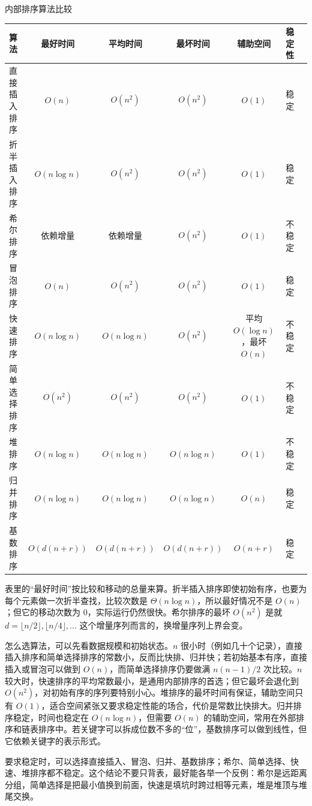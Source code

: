 \begin{tablebox}{内部排序算法比较}
\centering
\small
\begin{tabular}{lcccccc}
\toprule
算法 & 最好时间 & 平均时间 & 最坏时间 & 辅助空间 & 稳定性 \\
\midrule
直接插入排序 & $O(n)$ & $O(n^2)$ & $O(n^2)$ & $O(1)$ & 稳定 \\
折半插入排序 & $O(n\log n)$ & $O(n^2)$ & $O(n^2)$ & $O(1)$ & 稳定 \\
希尔排序 & 依赖增量 & 依赖增量 & $O(n^2)$ & $O(1)$ & 不稳定 \\
冒泡排序 & $O(n)$ & $O(n^2)$ & $O(n^2)$ & $O(1)$ & 稳定 \\
快速排序 & $O(n\log n)$ & $O(n\log n)$ & $O(n^2)$ & 平均 $O(\log n)$，最坏 $O(n)$ & 不稳定 \\
简单选择排序 & $O(n^2)$ & $O(n^2)$ & $O(n^2)$ & $O(1)$ & 不稳定 \\
堆排序 & $O(n\log n)$ & $O(n\log n)$ & $O(n\log n)$ & $O(1)$ & 不稳定 \\
归并排序 & $O(n\log n)$ & $O(n\log n)$ & $O(n\log n)$ & $O(n)$ & 稳定 \\
基数排序 & $O(d(n+r))$ & $O(d(n+r))$ & $O(d(n+r))$ & $O(n+r)$ & 稳定 \\
\bottomrule
\end{tabular}
\end{tablebox}

表里的“最好时间”按比较和移动的总量来算。折半插入排序即使初始有序，也要为每个元素做一次折半查找，比较次数是 $\Theta(n\log n)$，所以最好情况不是 $O(n)$；但它的移动次数为 0，实际运行仍然很快。希尔排序的最坏 $O(n^2)$ 是就 $d=\lfloor n/2\rfloor,\lfloor n/4\rfloor,\dots$ 这个增量序列而言的，换增量序列上界会变。

怎么选算法，可以先看数据规模和初始状态。$n$ 很小时（例如几十个记录），直接插入排序和简单选择排序的常数小，反而比快排、归并快；若初始基本有序，直接插入或冒泡可以做到 $O(n)$，而简单选择排序仍要做满 $n(n-1)/2$ 次比较。$n$ 较大时，快速排序的平均常数最小，是通用内部排序的首选；但它最坏会退化到 $O(n^2)$，对初始有序的序列要特别小心。堆排序的最坏时间有保证，辅助空间只有 $O(1)$，适合空间紧张又要求稳定性能的场合，代价是常数比快排大。归并排序稳定，时间也稳定在 $O(n\log n)$，但需要 $O(n)$ 的辅助空间，常用在外部排序和链表排序中。若关键字可以拆成位数不多的“位”，基数排序可以做到线性，但它依赖关键字的表示形式。

要求稳定时，可以选择直接插入、冒泡、归并、基数排序；希尔、简单选择、快速、堆排序都不稳定。这个结论不要只背表，最好能各举一个反例：希尔是远距离分组，简单选择是把最小值换到前面，快速是填坑时跨过相等元素，堆是堆顶与堆尾交换。

